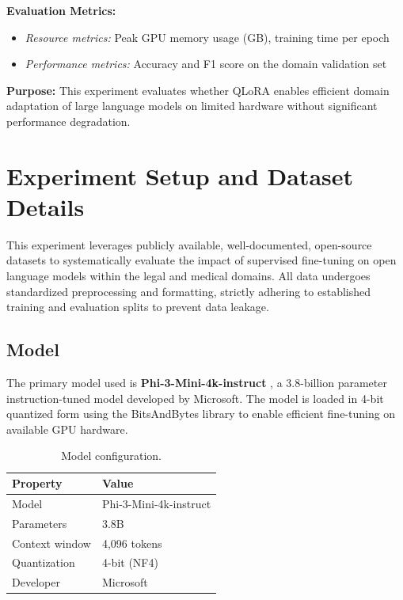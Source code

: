 \documentclass[12pt, letterpaper]{article}
\begin{document}
\textbf{Evaluation Metrics:}
\begin{itemize}
    \item \textit{Resource metrics:} Peak GPU memory usage (GB), training time per epoch
    \item \textit{Performance metrics:} Accuracy and F1 score on the domain validation set
\end{itemize}

\textbf{Purpose:} This experiment evaluates whether QLoRA enables efficient domain adaptation of large language models on limited hardware without significant performance degradation.

\section{Experiment Setup and Dataset Details}
\label{sec:setup}

This experiment leverages publicly available, well-documented, open-source datasets to systematically evaluate the impact of supervised fine-tuning on open language models within the legal and medical domains. All data undergoes standardized preprocessing and formatting, strictly adhering to established training and evaluation splits to prevent data leakage.

\subsection{Model}

The primary model used is \textbf{Phi-3-Mini-4k-instruct} \citep{abdin2024phi3}, a 3.8-billion parameter instruction-tuned model developed by Microsoft. The model is loaded in 4-bit quantized form using the BitsAndBytes library to enable efficient fine-tuning on available GPU hardware.

\begin{table}[H]
\centering
\caption{Model configuration.}
\label{tab:model-config}
\begin{tabular}{ll}
\toprule
\textbf{Property}       & \textbf{Value} \\
\midrule
Model                   & Phi-3-Mini-4k-instruct \\
Parameters              & 3.8B \\
Context window          & 4,096 tokens \\
Quantization            & 4-bit (NF4) \\
Developer               & Microsoft \\
\bottomrule
\end{tabular}
\end{table}
\end{document}
